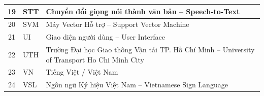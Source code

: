 \begin{table}[h]
\begin{tabular}{|c|l|p{10cm}|}
\hline
19 & STT     & Chuyển đổi giọng nói thành văn bản -- Speech-to-Text \\
\hline
20 & SVM     & Máy Vector Hỗ trợ -- Support Vector Machine \\
\hline
21 & UI      & Giao diện người dùng -- User Interface \\
\hline
22 & UTH     & Trường Đại học Giao thông Vận tải TP. Hồ Chí Minh -- University of Transport Ho Chi Minh City \\
\hline
23 & VN      & Tiếng Việt / Việt Nam \\
\hline
24 & VSL     & Ngôn ngữ Ký hiệu Việt Nam -- Vietnamese Sign Language \\
\hline
\end{tabular}
\end{table}